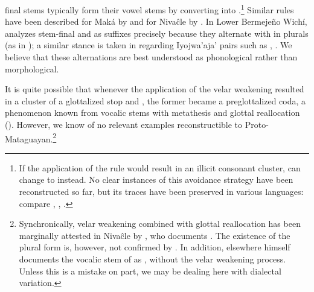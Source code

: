 final stems typically form their vowel stems by converting  into .\footnote{If the application of the rule would result in an illicit consonant cluster,  can change to  instead. No clear instances of this avoidance strategy have been reconstructed so far, but its traces have been preserved in various languages: compare  \citep[248]{JS16},  \citep[80]{KC94},  \citep[192]{VN14}.} Similar rules have been described for Maká by \citet[72–73]{AG89} and for Nivaĉle by \citet[9–10]{LC-VG-07}. In Lower Bermejeño Wichí, \citet[192]{VN14} analyzes stem-final  and  as suffixes precisely because they alternate with  in plurals (as in ); a similar stance is taken in \citet{JC14a} regarding Iyojwa'aja' pairs such as , . We believe that these alternations are best understood as phonological rather than morphological.

\begin{exe}
    \ex \tobacco
    \ex \powder
    \ex \rope
    \ex \bilecw
    \ex \plate
    \ex \headn
\end{exe}

It is quite possible that whenever the application of the velar weakening resulted in a cluster of a glottalized stop and , the former became a preglottalized coda, a phenomenon known from vocalic stems with metathesis and glottal reallocation (). However, we know of no relevant examples reconstructible to Proto-Mataguayan.\footnote{Synchronically, velar weakening combined with glottal reallocation has been marginally attested in Nivaĉle by \citet[182]{JS16}, who documents . The existence of the plural form  is, however, not confirmed by . In addition, elsewhere \citet[177]{JS16} himself documents the vocalic stem of  as , without the velar weakening process. Unless this is a mistake on  part, we may be dealing here with dialectal variation.}

